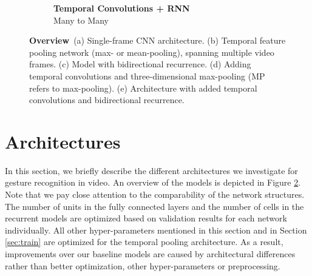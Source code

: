 \documentclass[11pt,a4paper]{article} \usepackage{a4wide}
\begin{document}
\begin{figure}[tb]
\begin{center}
\begin{subfigure}[b]{0.49\textwidth}
 \caption{\textbf{Temporal Convolutions + RNN} \\ Many to Many}
\label{fig:arch3drec}
\end{subfigure}
\end{center}
\caption{\textbf{Overview}\,  (a) Single-frame CNN architecture. (b) Temporal feature pooling network (max- or mean-pooling), spanning multiple video frames. (c) Model with bidirectional recurrence. (d) Adding temporal convolutions and three-dimensional max-pooling (MP refers to max-pooling). (e) Architecture with added temporal convolutions and bidirectional recurrence.}
\label{fig:arch}
\end{figure}


\section{Architectures} \label{sec:approach}

In this section, we briefly describe the different architectures we investigate for gesture recognition in video. An overview of the models is depicted in Figure \ref{fig:arch}. Note that we pay close attention to the comparability of the network structures. The number of units in the fully connected layers and the number of cells in the recurrent models are optimized based on validation results for each network individually. All other hyper-parameters mentioned in this section and in Section \ref{sec:train} are optimized for the temporal pooling architecture. As a result, improvements over our baseline models are caused by architectural differences rather than better optimization, other hyper-parameters or preprocessing. 
\end{document}
